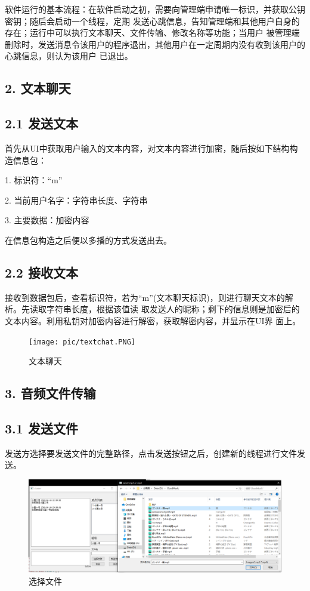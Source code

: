 \documentclass[UTF8]{ctexart}
\begin{document}
软件运行的基本流程：在软件启动之初，需要向管理端申请唯一标识，并获取公钥密钥；随后会启动一个线程，定期
发送心跳信息，告知管理端和其他用户自身的存在；运行中可以执行文本聊天、文件传输、修改名称等功能；当用户
被管理端删除时，发送消息令该用户的程序退出，其他用户在一定周期内没有收到该用户的心跳信息，则认为该用户
已退出。

\subsection*{\textbf{2. 文本聊天}}
\subsection*{2.1 发送文本}
首先从UI中获取用户输入的文本内容，对文本内容进行加密，随后按如下结构构造信息包：

1. 标识符：“m”

2. 当前用户名字：字符串长度、字符串

3. 主要数据：加密内容

在信息包构造之后便以多播的方式发送出去。

\subsection*{2.2 接收文本}
接收到数据包后，查看标识符，若为“m”(文本聊天标识)，则进行聊天文本的解析。先读取字符串长度，根据该值读
取发送人的昵称；剩下的信息则是加密后的文本内容。利用私钥对加密内容进行解密，获取解密内容，并显示在UI界
面上。

\begin{figure}[H]
\texttt{[image: pic/textchat.PNG]}
\caption{文本聊天}
\end{figure}

\subsection*{\textbf{3. 音频文件传输}}
\subsection*{3.1 发送文件}
发送方选择要发送文件的完整路径，点击发送按钮之后，创建新的线程进行文件发送。

\begin{figure}[H]
\includegraphics[width=\textwidth]{pic/filechoose1.PNG}
\caption{选择文件}
\end{figure}
\end{document}
